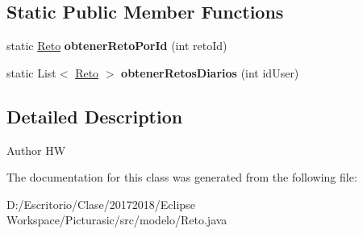 \subsection*{Static Public Member Functions}
\begin{DoxyCompactItemize}
\item 
\mbox{\label{classmodelo_1_1_reto_a24ad1371910508220819a560e55687ec}} 
static \mbox{\hyperlink{classmodelo_1_1_reto}{Reto}} {\bfseries obtener\+Reto\+Por\+Id} (int reto\+Id)
\item 
\mbox{\label{classmodelo_1_1_reto_a306160df168610c8b158853d312f37b3}} 
static List$<$ \mbox{\hyperlink{classmodelo_1_1_reto}{Reto}} $>$ {\bfseries obtener\+Retos\+Diarios} (int id\+User)
\end{DoxyCompactItemize}


\subsection{Detailed Description}
\begin{DoxyAuthor}{Author}
HW 
\end{DoxyAuthor}


The documentation for this class was generated from the following file\+:\begin{DoxyCompactItemize}
\item 
D\+:/\+Escritorio/\+Clase/20172018/\+Eclipse Workspace/\+Picturasic/src/modelo/Reto.\+java\end{DoxyCompactItemize}
